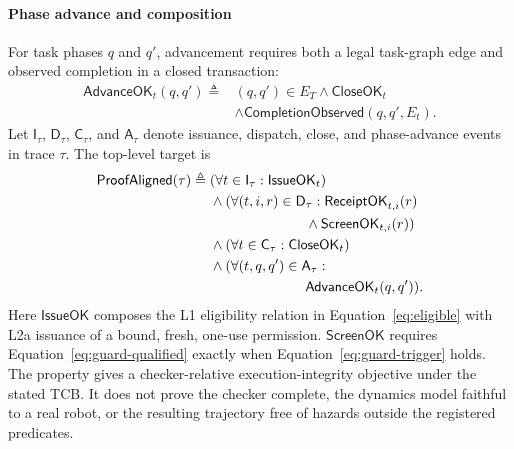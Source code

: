 \paragraph{Phase advance and composition}
For task phases $q$ and $q'$, advancement requires both a legal task-graph edge
and observed completion in a closed transaction:
\begin{equation}
\begin{aligned}
\mathsf{AdvanceOK}_t(q,q')\triangleq{}&
(q,q')\in E_T\land\mathsf{CloseOK}_t\\
&\land\mathsf{CompletionObserved}(q,q',E_t).
\end{aligned}
\label{eq:advance-ok}
\end{equation}
Let $\mathsf I_\tau$, $\mathsf D_\tau$, $\mathsf C_\tau$, and
$\mathsf A_\tau$ denote issuance, dispatch, close, and phase-advance events in
trace $\tau$.  The top-level target is
\begin{align}
\mathsf{ProofAligned}(\tau)\triangleq{}&
(\forall t\in\mathsf I_\tau:\mathsf{IssueOK}_t) \nonumber\\
&\land(\forall(t,i,r)\in\mathsf D_\tau:
\mathsf{ReceiptOK}_{t,i}(r) \nonumber\\
&\hspace{24mm}\land\mathsf{ScreenOK}_{t,i}(r)) \nonumber\\
&\land(\forall t\in\mathsf C_\tau:\mathsf{CloseOK}_t) \nonumber\\
&\land(\forall(t,q,q')\in\mathsf A_\tau: \nonumber\\
&\hspace{24mm}\mathsf{AdvanceOK}_t(q,q')).
\label{eq:proof-aligned}
\end{align}
Here $\mathsf{IssueOK}$ composes the L1 eligibility relation in
Equation~\ref{eq:eligible} with L2a issuance of a bound, fresh, one-use
permission.  $\mathsf{ScreenOK}$ requires
Equation~\ref{eq:guard-qualified} exactly when
Equation~\ref{eq:guard-trigger} holds.  The property gives a checker-relative
execution-integrity objective under the stated TCB.  It does not prove the
checker complete, the dynamics model faithful to a real robot, or the resulting
trajectory free of hazards outside the registered predicates.
